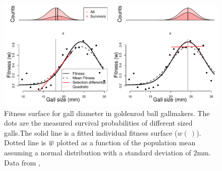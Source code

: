 \begin{figure}
\begin{center}
\includegraphics[width= \textwidth]{Journal_figs/Quant_gen/Weis_Gorman_gall_size_stablizing_sel/gall_size.pdf}
\end{center}
\caption{Fitness surface for gall diameter in goldenrod
ball gallmakers. The dots are the measured survival probabilities of
  different sized galls.The solid line is a fitted individual fitness
  surface ($w(~)$). Dotted line is $\overline{w}$ plotted as a function of
  the population mean assuming a normal distribution with a standard
  deviation of $2$mm. Data from \citet{weis1990measuring}, } \label{gall_size_stab}
\end{figure}




 


 

